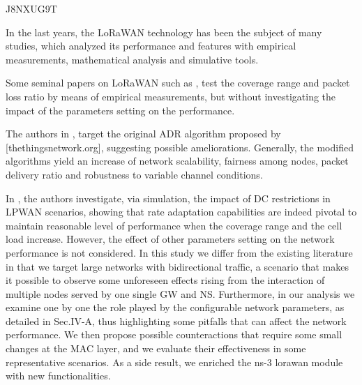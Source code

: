 
\cite{magrin_thorough_2019} J8NXUG9T

In the last years,
	the LoRaWAN technology has been the subject of many studies,
	which analyzed its performance and features with empirical measurements,
	mathematical analysis and simulative tools.

Some seminal papers on LoRaWAN such as \cite{petajajarvi_coverage_2015},
	\cite{wixted_evaluation_2016} test the coverage range and packet loss ratio by means of empirical measurements,
	but without investigating the impact of the parameters setting on the performance.








The authors in \cite{hauser_proposal_2017},
	\cite{slabicki_adaptive_2018} target the original ADR algorithm proposed by [thethingsnetwork.org],
	suggesting possible ameliorations.
Generally,
	the modified algorithms yield an increase of network scalability,
	fairness among nodes,
	packet delivery ratio and robustness to variable channel conditions.



In \cite{zucchetto_uncoordinated_2017},
	the authors investigate,
	via simulation,
	the impact of DC restrictions in LPWAN scenarios,
	showing that rate adaptation capabilities are indeed pivotal to maintain reasonable level of performance when the coverage range and the cell load increase.
However,
	the effect of other parameters setting on the network performance is not considered.
In this study we differ from the existing literature in that we target large networks with bidirectional traffic,
	a scenario that makes it possible to observe some unforeseen effects rising from the interaction of multiple nodes served by one single GW and NS.
Furthermore,
	in our analysis we examine one by one the role played by the configurable network parameters,
	as detailed in Sec.IV-A,
	thus highlighting some pitfalls that can affect the network performance.
We then propose possible counteractions that require some small changes at the MAC layer,
	and we evaluate their effectiveness in some representative scenarios.
As a side result,
	we enriched the ns-3 lorawan module with new functionalities.

